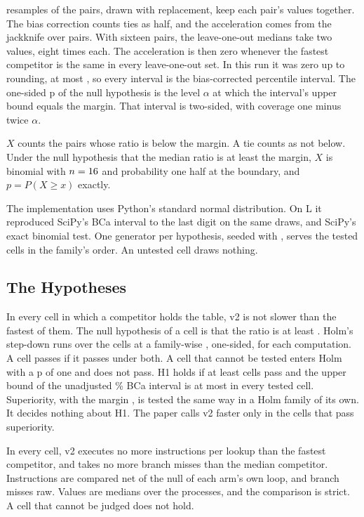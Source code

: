  \RoundTwoResamples{} resamples of the pairs, drawn with replacement,
keep each pair's values together. The bias correction counts ties as half, and the acceleration comes
from the jackknife over pairs. With sixteen pairs, the leave-one-out medians take two values, eight
times each. The acceleration is then zero whenever the fastest competitor is the same in every
leave-one-out set. In this run it was zero up to rounding, at most \HOneMaxAccel, so every interval is the
bias-corrected percentile interval. The one-sided p of the null hypothesis is the level $\alpha$ at
which the interval's upper bound equals the margin. That interval is two-sided, with coverage one
minus twice $\alpha$.

 $X$ counts the pairs whose ratio is below the margin. A tie counts as
not below. Under the null hypothesis that the median ratio is at least the margin, $X$ is binomial
with $n=16$ and probability one half at the boundary, and $p=P(X\geq x)$ exactly.

The implementation uses Python's standard normal distribution. On L it reproduced SciPy's BCa interval
to the last digit on the same draws, and SciPy's exact binomial test. One generator per hypothesis,
seeded with \RoundTwoResamplingSeed, serves the tested cells in the family's order. An untested cell
draws nothing.

\subsection{The Hypotheses}\label{sec:hypotheses}

 In every cell in which a competitor holds the table, v2 is not slower
than the fastest of them. The null hypothesis of a cell is that the ratio is at least \Margin. Holm's
step-down runs over the \HOneCells{} cells at a family-wise \Alpha, one-sided, for each computation. A
cell passes if it passes under both. A cell that cannot be tested enters Holm with a p of one and does
not pass. H1 holds if at least \HOneNeed{} cells pass and the upper bound of the unadjusted \Level\% BCa
interval is at most \HOneCapTwo{} in every tested cell. Superiority, with the margin \SupMargin, is
tested the same way in a Holm family of its own. It decides nothing about H1. The paper calls v2
faster only in the cells that pass superiority.

 In every cell, v2 executes no more instructions per lookup than the
fastest competitor, and takes no more branch misses than the median competitor. Instructions are
compared net of the null of each arm's own loop, and branch misses raw. Values are medians over the
processes, and the comparison is strict. A cell that cannot be judged does not hold.


